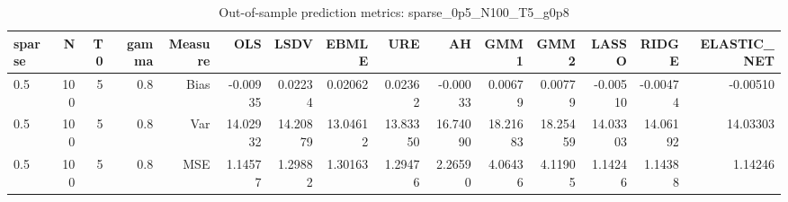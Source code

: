 \begin{table}[!htbp]\centering
\caption{Out-of-sample prediction metrics: sparse_0p5_N100_T5_g0p8}
\label{tab:table3_sparse_0p5_N100_T5_g0p8}
\begin{tabular}{lrrrrrrrrrrrrrr}
\hline
sparse & N & T0 & gamma & Measure & OLS & LSDV & EBMLE & URE & AH & GMM1 & GMM2 & LASSO & RIDGE & ELASTIC_NET \\
\hline
0.5 & 100 & 5 & 0.8 & Bias & -0.00935 & 0.02234 & 0.02062 & 0.02362 & -0.00033 & 0.00679 & 0.00779 & -0.00510 & -0.00474 & -0.00510 \\
0.5 & 100 & 5 & 0.8 & Var & 14.02932 & 14.20879 & 13.04612 & 13.83350 & 16.74090 & 18.21683 & 18.25459 & 14.03303 & 14.06192 & 14.03303 \\
0.5 & 100 & 5 & 0.8 & MSE & 1.14577 & 1.29882 & 1.30163 & 1.29476 & 2.26590 & 4.06436 & 4.11905 & 1.14246 & 1.14388 & 1.14246 \\
\hline
\end{tabular}
\end{table}

